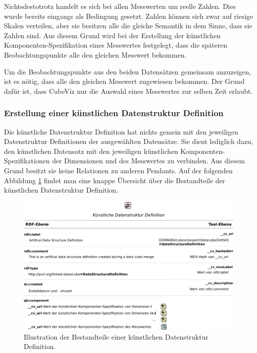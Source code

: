 \documentclass[11pt]{article}
\begin{document}
\noindent
Nichtsdestotrotz handelt es sich bei allen Messwerten um reelle Zahlen. Dies wurde bereits eingangs als Bedingung gesetzt. Zahlen können sich zwar auf riesige Skalen verteilen, aber sie besitzen alle die gleiche Semantik in dem Sinne, dass sie Zahlen sind. Aus diesem Grund wird bei der Erstellung der künstlichen Komponenten-Spezifikation eines Messwertes festgelegt, dass die späteren Beobachtungspunkte alle den gleichen Messwert bekommen. 

\newpage
\noindent
Um die Beobachtungspunkte aus den beiden Datensätzen gemeinsam anzuzeigen, ist es nötig, dass alle den gleichen Messwert zugewiesen bekommen. Der Grund dafür ist, dass CubeViz nur die Auswahl eines Messwertes zur selben Zeit erlaubt.


%
%
\subsubsection{Erstellung einer künstlichen Datenstruktur Definition}

Die künstliche Datenstruktur Definition hat nichts gemein mit den jeweiligen Datenstruktur Definitionen der ausgewählten Datensätze. Sie dient lediglich dazu, den künstlichen Datensatz mit den jeweiligen künstlichen Komponenten-Spezifikationen der Dimensionen und des Messwertes zu verbinden. Aus diesem Grund besitzt sie keine Relationen zu anderen Pendants. Auf der folgenden Abbildung \ref{fig:MergedDataCube_DataStructureDefinition} findet man eine knappe Übersicht über die Bestandteile der künstlichen Datenstruktur Definition. \\

%
%
\begin{figure}[h!]
    \centering
    \includegraphics[width=15cm]{MergedDataCube/DataStructureDefinition.pdf}
    \caption{Illustration der Bestandteile einer künstlichen Datenstruktur Definition.}
    \label{fig:MergedDataCube_DataStructureDefinition}
\end{figure}
\end{document}
